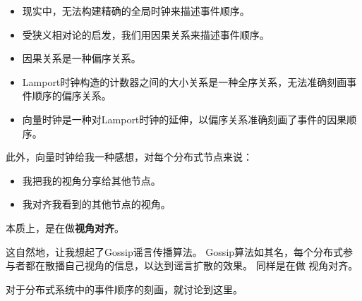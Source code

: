 \documentclass[cn,11pt,chinese]{elegantbook}
\begin{document}
\begin{itemize}
    \item 现实中，无法构建精确的全局时钟来描述事件顺序。
    \item 受狭义相对论的启发，我们用因果关系来描述事件顺序。
    \item 因果关系是一种偏序关系。
    \item Lamport时钟构造的计数器之间的大小关系是一种全序关系，无法准确刻画事件顺序的偏序关系。
    \item 向量时钟是一种对Lamport时钟的延伸，以偏序关系准确刻画了事件的因果顺序。
\end{itemize}

此外，向量时钟给我一种感想，对每个分布式节点来说：

\begin{itemize}
    \item 我把我的视角分享给其他节点。
    \item 我对齐我看到的其他节点的视角。
\end{itemize}

本质上，是在做\textbf{视角对齐}。

这自然地，让我想起了Gossip谣言传播算法。 Gossip算法如其名，每个分布式参与者都在散播自己视角的信息，以达到谣言扩散的效果。 同样是在做 视角对齐。

对于分布式系统中的事件顺序的刻画，就讨论到这里。
\end{document}

